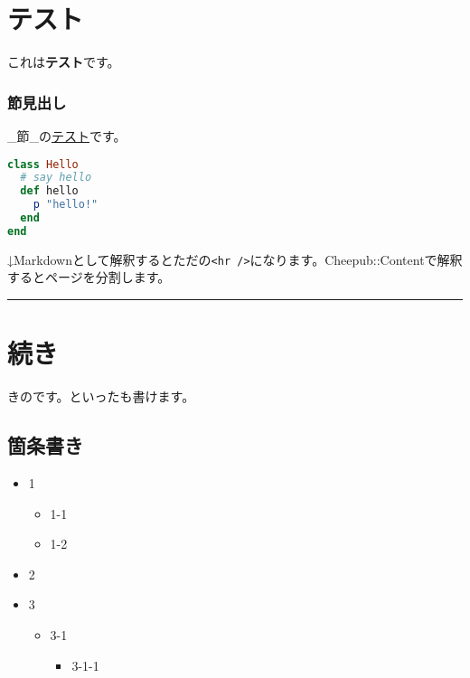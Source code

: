 \chapter*{テスト}\hypertarget{テスト}{}\label{テスト}

これは\textbf{テスト}です。

\subsection*{節見出し}\hypertarget{節見出し}{}\label{節見出し}

\_節\_の\href{https://example.jp/}{テスト}です。

\begin{lstlisting}[showspaces=false,showtabs=false,language=ruby,basicstyle=\ttfamily\footnotesize,columns=fixed,frame=tlbr]
class Hello
  # say hello
  def hello
    p "hello!"
  end
end

\end{lstlisting}   %



↓Markdownとして解釈するとただの\texttt{\textless{}hr /\textgreater{}}になります。Cheepub::Contentで解釈するとページを分割します。

\begin{center}
\rule{3in}{0.4pt}
\end{center}

\chapter*{続き}\hypertarget{続き}{}\label{続き}

きのです。といったも書けます。

\section*{箇条書き}\hypertarget{箇条書き}{}\label{箇条書き}

\begin{itemize}
\item{} 1


\begin{itemize}
\item{} 1-1
\item{} 1-2
\end{itemize}
\item{} 2
\item{} 3


\begin{itemize}
\item{} 3-1


\begin{itemize}
\item{} 3-1-1
\end{itemize}
\end{itemize}
\end{itemize}

